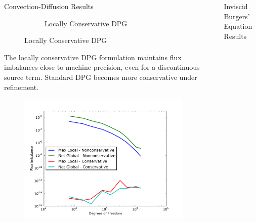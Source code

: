 \documentclass[final]{beamer}
\newlength{\sepwid}
\newlength{\onecolwid}
\begin{document}
\begin{frame}[t]
\begin{columns}[t]
\begin{column}{\onecolwid}
\begin{block}{Convection-Diffusion Results}
\begin{figure}
\begin{subfigure}[t]{0.49\textwidth}
\caption*{\footnotesize{Locally Conservative DPG}}
\end{subfigure}
\end{figure}

\vspace{3ex}
The locally conservative DPG formulation maintains flux imbalances
close to machine precision, even for a discontinuous source term. Standard DPG
becomes more conservative under refinement.
\begin{figure}
\includegraphics[width=0.8\linewidth]{figs/Discontinuous/modifiedFlux.pdf}
\end{figure}

\end{block}


\end{column} %

\begin{column}{\sepwid}\end{column} %

\begin{column}{\onecolwid} %

\begin{block}{Inviscid Burgers' Equation Results}


\end{block}
\end{column}
\end{columns}
\end{frame}
\end{document}
